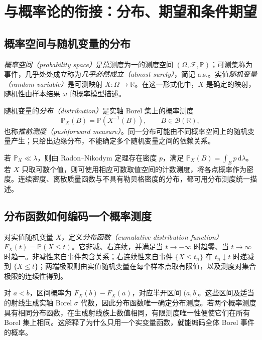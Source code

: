 \setcounter{chapter}{12} %
\chapter{与概率论的衔接：分布、期望和条件期望}
\label{chap:mt-probability}

\section{概率空间与随机变量的分布}
\emph{概率空间（probability space）}是总测度为一的测度空间 $(\Omega,\mathcal F,\mathbb P)$；可测集称为事件，几乎处处成立称为\emph{几乎必然成立（almost surely）}，简记 a.s.。实值\emph{随机变量（random variable）}是可测映射 $X:\Omega\to\mathbb R$。在这一形式化中，$X$ 是确定的映射，随机性由样本结果 $\omega$ 的概率模型描述。

随机变量的\emph{分布（distribution）}是实轴 Borel 集上的概率测度
\begin{equation}
 \mathbb P_X(B)=\mathbb P(X^{-1}(B)),\qquad B\in\mathcal B(\mathbb R),
 \label{eq:mt-pushforward}
\end{equation}
也称\emph{推前测度（pushforward measure）}。同一分布可能由不同概率空间上的随机变量产生；只给出边缘分布，不能确定多个随机变量之间的依赖关系。

若 $\mathbb P_X\ll\lambda$，则由 Radon--Nikodym 定理存在密度 $p$，满足 $\mathbb P_X(B)=\int_Bp\,\mathrm d\lambda$。若 $X$ 只取可数个值，则可使用相应可数取值空间的计数测度，将各点概率作为密度。连续密度、离散质量函数与不具有勒贝格密度的分布，都可用分布测度统一描述。

\section{分布函数如何编码一个概率测度}
对实值随机变量 $X$，定义\emph{分布函数（cumulative distribution function）}
$F_X(t)=\mathbb P(X\leq t)$。它非减、右连续，并满足当 $t\to-\infty$ 时趋零、当 $t\to\infty$ 时趋一。非减性来自事件包含关系；右连续性来自事件 $\{X\leq t_n\}$ 在 $t_n\downarrow t$ 时递减到 $\{X\leq t\}$；两端极限则由实值随机变量在每个样本点取有限值，以及测度对集合极限的连续性得到。

对 $a<b$，区间概率为 $F_X(b)-F_X(a)$，对应半开区间 $(a,b]$。这些区间及适当的射线生成实轴 Borel $\sigma$ 代数，因此分布函数唯一确定分布测度。若两个概率测度具有相同分布函数，在生成射线族上数值相同，有限测度唯一性便使它们在所有 Borel 集上相同。这解释了为什么只用一个实变量函数，就能编码全体 Borel 事件的概率。

